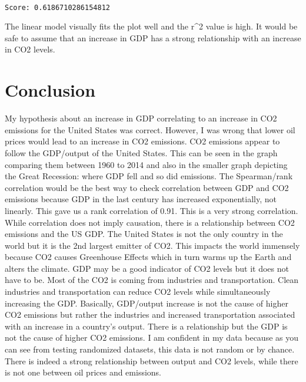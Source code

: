 \documentclass[11pt]{article}
\begin{document}
    \begin{center}
    \end{center}
    { \hspace*{\fill} \\}
    
    \begin{Verbatim}[commandchars=\\\{\}]
Score: 0.6186710286154812

    \end{Verbatim}

    The linear model visually fits the plot well and the r\^{}2 value is
high. It would be safe to assume that an increase in GDP has a strong
relationship with an increase in CO2 levels.

    \section{Conclusion}\label{conclusion}

My hypothesis about an increase in GDP correlating to an increase in CO2
emissions for the United States was correct. However, I was wrong that
lower oil prices would lead to an increase in CO2 emissions. CO2
emissions appear to follow the GDP/output of the United States. This can
be seen in the graph comparing them between 1960 to 2014 and also in the
smaller graph depicting the Great Recession: where GDP fell and so did
emissions. The Spearman/rank correlation would be the best way to check
correlation between GDP and CO2 emissions because GDP in the last
century has increased exponentially, not linearly. This gave us a rank
correlation of 0.91. This is a very strong correlation. While
correlation does not imply causation, there is a relationship between
CO2 emissions and the US GDP. The United States is not the only country
in the world but it is the 2nd largest emitter of CO2. This impacts the
world immensely because CO2 causes Greenhouse Effects which in turn
warms up the Earth and alters the climate. GDP may be a good indicator
of CO2 levels but it does not have to be. Most of the CO2 is coming from
industries and transportation. Clean industries and transportation can
reduce CO2 levels while simultaneously increasing the GDP. Basically,
GDP/output increase is not the cause of higher CO2 emissions but rather
the industries and increased transportation associated with an increase
in a country's output. There is a relationship but the GDP is not the
cause of higher CO2 emissions. I am confident in my data because as you
can see from testing randomized datasets, this data is not random or by
chance. There is indeed a strong relationship between output and CO2
levels, while there is not one between oil prices and emissions.
\end{document}
